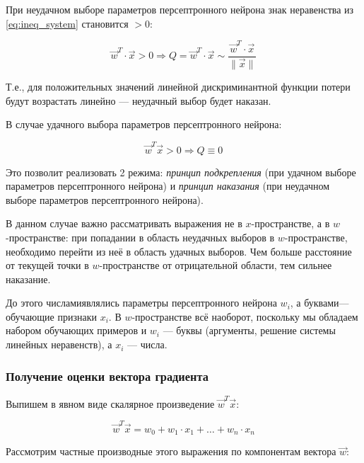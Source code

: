 \documentclass[a4paper]{article}
\numberwithin{equation}{subsection}
\begin{document}
При неудачном выборе параметров персептронного нейрона знак неравенства 
из \ref{eq:ineq_system} становится $>0$:

\begin{equation}
    \vec{w}^T \cdot \vec{x} >0 \Rightarrow Q = \vec{w}^T \cdot \vec{x} \sim \dfrac{\vec{w}^T \cdot \vec{x}}{\| \vec{x} \|}
\end{equation}

Т.е., для положительных значений линейной дискриминантной функции потери будут
возрастать линейно --- неудачный выбор будет \glqq наказан\grqq.

В случае удачного выбора параметров персептронного нейрона:

\begin{equation}
    \vec{w}^T \vec{x} >0 \Rightarrow Q \equiv 0
\end{equation}

Это позволит реализовать 2 режима: \textit{принцип подкрепления} (при удачном
выборе параметров персептронного нейрона) и \textit{принцип наказания} 
(при неудачном выборе параметров персептронного нейрона).

В данном случае важно рассматривать выражения не в $x$-пространстве, 
а в $w$-пространстве: при попадании в область неудачных выборов в $w$-пространстве,
необходимо перейти из неё в область удачных выборов. Чем больше расстояние от текущей
точки в $w$-пространстве от отрицательной области, тем сильнее \glqq наказание\grqq.

До этого \glqq числами\grqq являлись параметры персептронного нейрона $w_i$, а 
\glqq буквами\grqq --- обучающие признаки $x_i$. В $w$-пространстве всё наоборот,
поскольку мы обладаем набором обучающих примеров и $w_i$ --- \glqq буквы\grqq
(аргументы, решение системы линейных неравенств), а $x_i$ --- \glqq числа\grqq.





\subsubsection{Получение оценки вектора градиента}

Выпишем в явном виде скалярное произведение $\vec{w}^T \vec{x}$:

\begin{equation}
    \vec{w}^T \vec{x} = w_0 + w_1 \cdot x_1 + \dots + w_n \cdot x_n
\end{equation}

Рассмотрим частные производные этого выражения по компонентам вектора $\vec{w}$:
\end{document}
